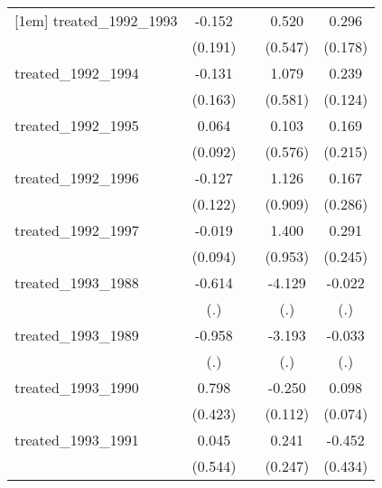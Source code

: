 {\begin{tabular}{l*{4}{c}}
[1em]
treated\_1992\_1993&      -0.152         &                     &       0.520         &       0.296         \\
            &     (0.191)         &                     &     (0.547)         &     (0.178)         \\
[1em]
treated\_1992\_1994&      -0.131         &                     &       1.079         &       0.239         \\
            &     (0.163)         &                     &     (0.581)         &     (0.124)         \\
[1em]
treated\_1992\_1995&       0.064         &                     &       0.103         &       0.169         \\
            &     (0.092)         &                     &     (0.576)         &     (0.215)         \\
[1em]
treated\_1992\_1996&      -0.127         &                     &       1.126         &       0.167         \\
            &     (0.122)         &                     &     (0.909)         &     (0.286)         \\
[1em]
treated\_1992\_1997&      -0.019         &                     &       1.400         &       0.291         \\
            &     (0.094)         &                     &     (0.953)         &     (0.245)         \\
[1em]
treated\_1993\_1988&      -0.614         &                     &      -4.129         &      -0.022         \\
            &         (.)         &                     &         (.)         &         (.)         \\
[1em]
treated\_1993\_1989&      -0.958         &                     &      -3.193         &      -0.033         \\
            &         (.)         &                     &         (.)         &         (.)         \\
[1em]
treated\_1993\_1990&       0.798         &                     &      -0.250\sym{*}  &       0.098         \\
            &     (0.423)         &                     &     (0.112)         &     (0.074)         \\
[1em]
treated\_1993\_1991&       0.045         &                     &       0.241         &      -0.452         \\
            &     (0.544)         &                     &     (0.247)         &     (0.434)         \\

\end{tabular}}
